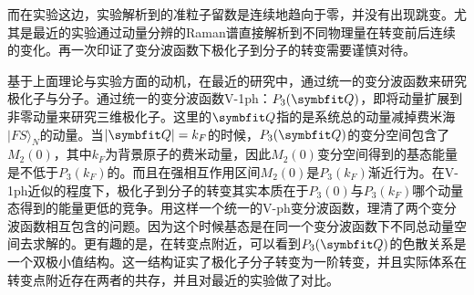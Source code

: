 而在实验这边，实验解析到的准粒子留数是连续地趋向于零\cite{Schirotzekobservation,koschorreck2012attractive}，并没有出现跳变。尤其是最近的实验通过动量分辨的Raman谱直接解析到不同物理量在转变前后连续的变化\cite{Sagi2020}。再一次印证了变分波函数下极化子到分子的转变需要谨慎对待。

基于上面理论与实验方面的动机，在最近的研究中，通过统一的变分波函数来研究极化子与分子\cite{Cui2020Fermi}。通过统一的变分波函数V-1ph：$P_3(\Vector{Q})$，即将动量扩展到非零动量来研究三维极化子。这里的$\Vector{Q}$指的是系统总的动量减掉费米海$|FS\rangle_N$的动量。当$|\Vector{Q}|=k_F$的时候，$P_3(\Vector{Q})$的变分空间包含了$M_2(0)$，其中$k_F$为背景原子的费米动量，因此$M_2(0)$变分空间得到的基态能量是不低于$P_3(k_F)$的。而且在强相互作用区间$M_2(0)$是$P_3(k_F)$渐近行为。在V-1ph近似的程度下，极化子到分子的转变其实本质在于$P_3(0)$与$P_3(k_F)$哪个动量态得到的能量更低的竞争。用这样一个统一的V-ph变分波函数，理清了两个变分波函数相互包含\cite{edwards2013smooth}的问题。因为这个时候基态是在同一个变分波函数下不同总动量空间去求解的。更有趣的是，在转变点附近，可以看到$P_3(\Vector{Q})$的色散关系是一个双极小值结构。这一结构证实了极化子分子转变为一阶转变，并且实际体系在转变点附近存在两者的共存，并且对最近的实验做了对比。

